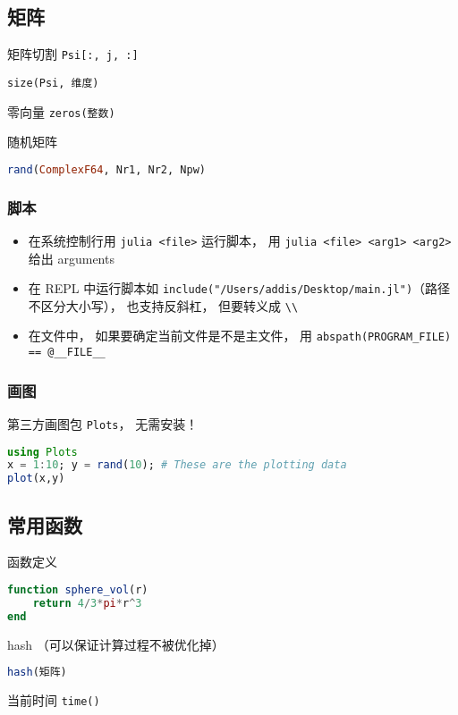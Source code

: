 \subsection{矩阵}
矩阵切割 \verb|Psi[:, j, :]|

\verb|size(Psi, 维度)|

零向量 \verb|zeros(整数)|

随机矩阵
\begin{lstlisting}[language=julia]
rand(ComplexF64, Nr1, Nr2, Npw)
\end{lstlisting}

\subsubsection{脚本}
\begin{itemize}
\item 在系统控制行用 \verb|julia <file>| 运行脚本， 用 \verb|julia <file> <arg1> <arg2>| 给出 arguments
\item 在 REPL 中运行脚本如 \verb|include("/Users/addis/Desktop/main.jl")|（路径不区分大小写）， 也支持反斜杠， 但要转义成 \verb|\\|
\item 在文件中， 如果要确定当前文件是不是主文件， 用 \verb|abspath(PROGRAM_FILE) == @__FILE__|
\end{itemize}

\subsubsection{画图}
第三方画图包 \verb|Plots|， 无需安装！
\begin{lstlisting}[language=julia]
using Plots
x = 1:10; y = rand(10); # These are the plotting data
plot(x,y)
\end{lstlisting}

\subsection{常用函数}
函数定义
\begin{lstlisting}[language=julia]
function sphere_vol(r)
    return 4/3*pi*r^3
end
\end{lstlisting}

hash （可以保证计算过程不被优化掉）
\begin{lstlisting}[language=julia]
hash(矩阵)
\end{lstlisting}

当前时间 \verb|time()|
